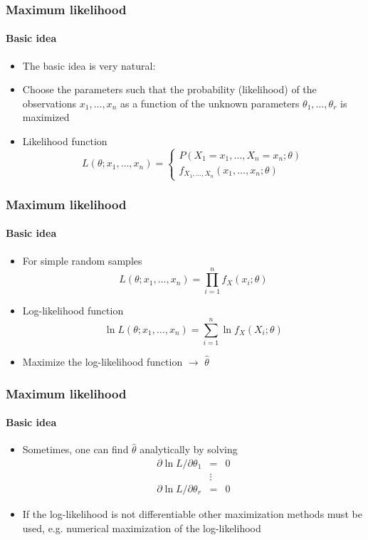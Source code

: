 \documentclass[title={Introduction to R}, author={Mutschler and Zaharieva}, inst={Institute for Econometrics and Empirical Economics}]{beamer}
\begin{document}
\begin{frame}
\frametitle{Maximum likelihood}
\framesubtitle{Basic idea}
\begin{itemize}
\item The basic idea is very natural:
\item Choose the parameters such that the probability (likelihood) of the
observations $x_{1},\ldots ,x_{n}$ as a function of the unknown parameters $\theta _{1},\ldots ,\theta _{r}$ is maximized
\item Likelihood function
\begin{equation*}
L(\theta ;x_{1},\dots ,x_{n})=\left\{ 
\begin{array}{l}
P(X_{1}=x_{1},\ldots ,X_{n}=x_{n};\theta ) \\[3mm] 
f_{X_{1},\dots ,X_{n}}(x_{1},\dots ,x_{n};\theta )%
\end{array}%
\right.
\end{equation*}
\end{itemize}
\end{frame}


\begin{frame}
\frametitle{Maximum likelihood}
\framesubtitle{Basic idea}
\begin{itemize}
\item For simple random samples
\begin{equation*}
L(\theta ;x_{1},\dots ,x_{n})=\prod_{i=1}^{n}f_{X}(x_{i};\theta )
\end{equation*}
\item Log-likelihood function
\begin{equation*}
\ln L(\theta ;x_{1},\ldots ,x_{n})=\sum_{i=1}^{n}\ln f_{X}(X_{i};\theta )
\end{equation*}
\item Maximize the log-likelihood function $\longrightarrow $ $\hat{\theta}$
\end{itemize}
\end{frame}


\begin{frame}
\frametitle{Maximum likelihood}
\framesubtitle{Basic idea}
\begin{itemize}
\item Sometimes, one can find $\hat{\theta}$ analytically by solving%
\begin{eqnarray*}
\partial \ln L/\partial \theta _{1} &=&0 \\
&\vdots & \\
\partial \ln L/\partial \theta _{r} &=&0
\end{eqnarray*}
\item If the log-likelihood is not differentiable other maximization methods
must be used, e.g. numerical maximization of the log-likelihood
\end{itemize}
\end{frame}
\end{document}
